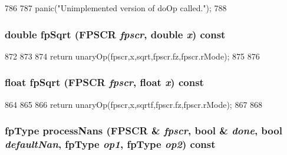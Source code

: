 \begin{DoxyCode}
786     {
787         panic("Unimplemented version of doOp called.\n");
788     }
\end{DoxyCode}
\hypertarget{classArmISA_1_1FpOp_add67ed9b4396f7bde492ceaaf6af403d}{
\subsubsection[{fpSqrt}]{\setlength{\rightskip}{0pt plus 5cm}double fpSqrt (FPSCR {\em fpscr}, \/  double {\em x}) const}}
\label{classArmISA_1_1FpOp_add67ed9b4396f7bde492ceaaf6af403d}



\begin{DoxyCode}
872     {
873 
874         return unaryOp(fpscr,x,sqrt,fpscr.fz,fpscr.rMode);
875 
876     }
\end{DoxyCode}
\hypertarget{classArmISA_1_1FpOp_a9a613f482c9fae6ba0296c19fe21a40d}{
\subsubsection[{fpSqrt}]{\setlength{\rightskip}{0pt plus 5cm}float fpSqrt (FPSCR {\em fpscr}, \/  float {\em x}) const}}
\label{classArmISA_1_1FpOp_a9a613f482c9fae6ba0296c19fe21a40d}



\begin{DoxyCode}
864     {
865 
866         return unaryOp(fpscr,x,sqrtf,fpscr.fz,fpscr.rMode);
867 
868     }
\end{DoxyCode}
\hypertarget{classArmISA_1_1FpOp_a0bb9efaddc2b7ac41cd08d497657e092}{
\subsubsection[{processNans}]{\setlength{\rightskip}{0pt plus 5cm}fpType processNans (FPSCR \& {\em fpscr}, \/  bool \& {\em done}, \/  bool {\em defaultNan}, \/  fpType {\em op1}, \/  fpType {\em op2}) const}}
\label{classArmISA_1_1FpOp_a0bb9efaddc2b7ac41cd08d497657e092}



